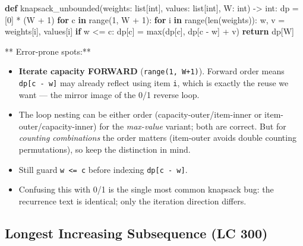 \documentclass[11pt]{article}
\providecommand{\tightlist}{\setlength{\itemsep}{1pt}\setlength{\parskip}{0pt}}
\newenvironment{Shaded}{\begin{snugshade}}{\end{snugshade}}
\newcommand{\BuiltInTok}[1]{\textcolor[rgb]{0.50,0.55,0.55}{#1}}
\newcommand{\ControlFlowTok}[1]{\textcolor[rgb]{0.99,0.74,0.29}{\textbf{#1}}}
\newcommand{\DecValTok}[1]{\textcolor[rgb]{0.96,0.45,0.00}{#1}}
\newcommand{\KeywordTok}[1]{\textcolor[rgb]{0.81,0.81,0.76}{\textbf{#1}}}
\newcommand{\NormalTok}[1]{\textcolor[rgb]{0.81,0.81,0.76}{#1}}
\newcommand{\OperatorTok}[1]{\textcolor[rgb]{0.81,0.81,0.76}{#1}}
\begin{document}

\begin{Shaded}
\begin{Highlighting}[]
\KeywordTok{def}\NormalTok{ knapsack\_unbounded(weights: }\BuiltInTok{list}\NormalTok{[}\BuiltInTok{int}\NormalTok{], values: }\BuiltInTok{list}\NormalTok{[}\BuiltInTok{int}\NormalTok{], W: }\BuiltInTok{int}\NormalTok{) }\OperatorTok{{-}\textgreater{}} \BuiltInTok{int}\NormalTok{:}
\NormalTok{    dp }\OperatorTok{=}\NormalTok{ [}\DecValTok{0}\NormalTok{] }\OperatorTok{*}\NormalTok{ (W }\OperatorTok{+} \DecValTok{1}\NormalTok{)}
    \ControlFlowTok{for}\NormalTok{ c }\KeywordTok{in} \BuiltInTok{range}\NormalTok{(}\DecValTok{1}\NormalTok{, W }\OperatorTok{+} \DecValTok{1}\NormalTok{):}
        \ControlFlowTok{for}\NormalTok{ i }\KeywordTok{in} \BuiltInTok{range}\NormalTok{(}\BuiltInTok{len}\NormalTok{(weights)):}
\NormalTok{            w, v }\OperatorTok{=}\NormalTok{ weights[i], values[i]}
            \ControlFlowTok{if}\NormalTok{ w }\OperatorTok{\textless{}=}\NormalTok{ c:}
\NormalTok{                dp[c] }\OperatorTok{=} \BuiltInTok{max}\NormalTok{(dp[c], dp[c }\OperatorTok{{-}}\NormalTok{ w] }\OperatorTok{+}\NormalTok{ v)}
    \ControlFlowTok{return}\NormalTok{ dp[W]}
\end{Highlighting}
\end{Shaded}

** Error-prone spots:**

\begin{itemize}
\tightlist
\item
  \textbf{Iterate capacity FORWARD} (\texttt{range(1,\ W+1)}). Forward order means \texttt{dp{[}c\ -\ w{]}} may already reflect using item \texttt{i}, which is exactly the reuse we want --- the mirror image of the 0/1 reverse loop.
\item
  The loop nesting can be either order (capacity-outer/item-inner or item-outer/capacity-inner) for the \emph{max-value} variant; both are correct. But for \emph{counting combinations} the order matters (item-outer avoids double counting permutations), so keep the distinction in mind.
\item
  Still guard \texttt{w\ \textless{}=\ c} before indexing \texttt{dp{[}c\ -\ w{]}}.
\item
  Confusing this with 0/1 is the single most common knapsack bug: the recurrence text is identical; only the iteration direction differs.
\end{itemize}

\subsection{Longest Increasing Subsequence (LC 300)}\label{longest-increasing-subsequence-lc-300}
\end{document}
